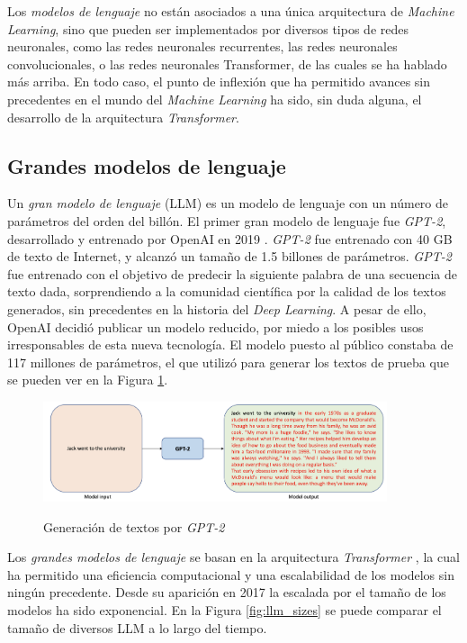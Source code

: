 Los \textit{modelos de lenguaje} no están asociados a una única arquitectura de \textit{Machine Learning}, sino que pueden ser implementados por diversos tipos de redes neuronales, como las redes neuronales recurrentes, las redes neuronales convolucionales, o las redes neuronales Transformer, de las cuales se ha hablado más arriba. En todo caso, el punto de inflexión que ha permitido avances sin precedentes en el mundo del \textit{Machine Learning} ha sido, sin duda alguna, el desarrollo de la arquitectura \textit{Transformer}. 

\subsection{Grandes modelos de lenguaje}

Un \textit{gran modelo de lenguaje} (LLM) es un modelo de lenguaje con un número de parámetros del orden del billón. El primer gran modelo de lenguaje fue \textit{GPT-2}, desarrollado y entrenado por OpenAI en 2019 \citep{radfordLanguageModelsAre2019a}. \textit{GPT-2} fue entrenado con 40 GB de texto de Internet, y alcanzó un tamaño de 1.5 billones de parámetros. \textit{GPT-2} fue entrenado con el objetivo de predecir la siguiente palabra de una secuencia de texto dada, sorprendiendo a la comunidad científica por la calidad de los textos generados, sin precedentes en la historia del \textit{Deep Learning}. A pesar de ello, OpenAI decidió publicar un modelo reducido, por miedo a los posibles usos irresponsables de esta nueva tecnología. El modelo puesto al público constaba de 117 millones de parámetros, el que utilizó para generar los textos de prueba que se pueden ver en la Figura \ref{fig:gpt2_text_generation}. 

\begin{figure}[]
    \caption{Generación de textos por \textit{GPT-2}}
    \centering
    \includegraphics[width=0.9\textwidth]{./figuras/GPT2_text_generation.png}
    \label{fig:gpt2_text_generation}
\end{figure}

Los \textit{grandes modelos de lenguaje} se basan en la arquitectura \textit{Transformer} \citep{vaswaniAttentionAllYou2017}, la cual ha permitido una eficiencia computacional y una escalabilidad de los modelos sin ningún precedente. Desde su aparición en 2017 la escalada por el tamaño de los modelos ha sido exponencial. En la Figura \ref{fig:llm_sizes} se puede comparar el tamaño de diversos LLM a lo largo del tiempo.

